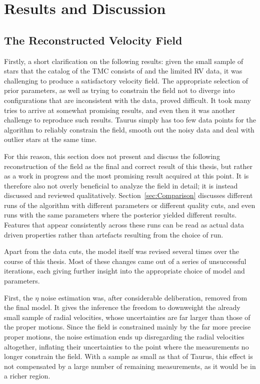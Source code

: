 \chapter{Results and Discussion}
\label{sec:Results}

\section{The Reconstructed Velocity Field}
Firstly, a short clarification on the following results: given the small sample
of stars that the catalog of the TMC consists of and the limited RV data, it was challenging
to produce a satisfactory velocity field. The appropriate selection of prior parameters, as well as
trying to constrain the field not to diverge into configurations that are inconsistent with the
data, proved difficult. It took many tries to arrive at somewhat promising results, and even then it
was another challenge to reproduce such results. Taurus simply has too few data points
for the algorithm to reliably constrain the field, smooth out the noisy data and deal with outlier stars
at the same time.

For this reason, this section does not present and discuss the following reconstruction of the field as the final and correct result of this thesis, but
rather as a work in progress and the most promising result acquired at this point. It is therefore also
not overly beneficial to analyze the field in detail; it is instead discussed and reviewed qualitatively.
Section~\ref{sec:Comparison} discusses different runs of the algorithm with different parameters or different quality
cuts, and even runs with the same parameters where the posterior yielded different results. Features that
appear consistently across these runs can be read as actual data driven properties rather than artefacts resulting from the choice of run.

Apart from the data cuts, the model itself was revised several times over the course of this thesis.
Most of these changes came out of a series of unsuccessful iterations, each giving further
insight into the appropriate choice of model and parameters.

First, the $\eta$ noise estimation was, after considerable deliberation, removed from the final
model. It gives the inference the freedom to downweight the already small sample of radial
velocities, whose uncertainties are far larger than those of the proper motions. Since the field
is constrained mainly by the far more precise proper motions, the noise estimation ends up
disregarding the radial velocities altogether, inflating their uncertainties to the point where
the measurements no longer constrain the field. With a sample as small as that of Taurus, this
effect is not compensated by a large number of remaining measurements, as it would be in a richer
region.

